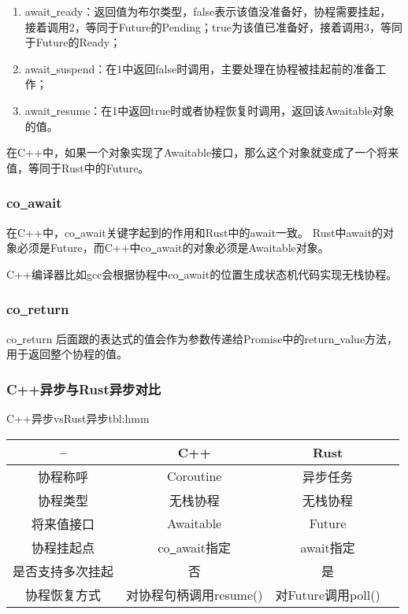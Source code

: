 \documentclass[supercite]{HustGraduPaper}
\theoremstyle{definition}
\begin{document}
\begin{enumerate}
  \item await\underline{~}ready：返回值为布尔类型，false表示该值没准备好，协程需要挂起，
    接着调用2，等同于Future的Pending；true为该值已准备好，接着调用3，等同于Future的Ready；
  \item await\underline{~}suspend：在1中返回false时调用，主要处理在协程被挂起前的准备工作；
  \item await\underline{~}resume：在1中返回true时或者协程恢复时调用，返回该Awaitable对象的值。
\end{enumerate}

在C++中，如果一个对象实现了Awaitable接口，那么这个对象就变成了一个将来值，等同于Rust中的Future。\par

\subsubsection{co\underline{~}await}
在C++中，co\underline{~}await关键字起到的作用和Rust中的await一致。
Rust中await的对象必须是Future，而C++中co\underline{~}await的对象必须是Awaitable对象。\par

C++编译器比如gcc会根据协程中co\underline{~}await的位置生成状态机代码实现无栈协程。\par

\subsubsection{co\underline{~}return}

co\underline{~}return 后面跟的表达式的值会作为参数传递给Promise中的return\underline{~}value方法，
用于返回整个协程的值。\par

\subsubsection{C++异步与Rust异步对比}

\begin{generaltab}{C++异步vsRust异步}{tbl:hmm}
  \begin{tabular}{c|ccc}
    \toprule
    -- & C++ & Rust \\
    \midrule
    协程称呼 & Coroutine & 异步任务 \\
    协程类型 & 无栈协程 & 无栈协程 \\
    将来值接口 & Awaitable & Future \\
    协程挂起点 & co\underline{~}await指定 & await指定 \\
    是否支持多次挂起 & 否 & 是 \\
    协程恢复方式 & 对协程句柄调用resume() & 对Future调用poll() \\
    \bottomrule
  \end{tabular}
\end{generaltab}
\end{document}
